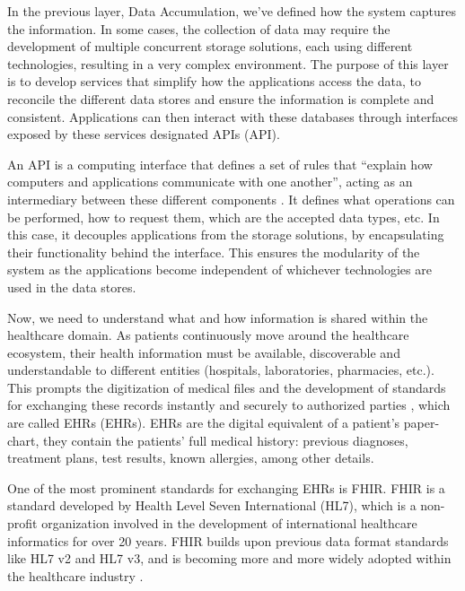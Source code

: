 
In the previous layer, Data Accumulation, we've defined how the system captures the information. In some cases, the collection of data may require the development of multiple concurrent storage solutions, each using different technologies, resulting in a very complex environment. The purpose of this layer is to develop services that simplify how the applications access the data, to reconcile the different data stores and ensure the information is complete and consistent. Applications can then interact with these databases through interfaces exposed by these services designated \acl{API}s (\acs{API}). \bigskip 

An \acs{API} is a computing interface that defines a set of rules that ``explain how computers and applications communicate with one another'', acting as an intermediary between these different components \cite{IBMAPI}. It defines what operations can be performed, how to request them, which are the accepted data types, etc. In this case, it decouples applications from the storage solutions, by encapsulating their functionality behind the interface. This ensures the modularity of the system as the applications become independent of whichever technologies are used in the data stores. \bigskip


Now, we need to understand what and how information is shared within the healthcare domain. As patients continuously move around the healthcare ecosystem, their health information must be available, discoverable and understandable to different entities (hospitals, laboratories, pharmacies, etc.). This prompts the digitization of medical files and the development of standards for exchanging these records instantly and securely to authorized parties \cite{HL72019}, which are called \acl{EHR}s (\acs{EHR}s). \acs{EHR}s are the digital equivalent of a patient's paper-chart, they contain the patients' full medical history: previous diagnoses, treatment plans, test results, known allergies, among other details. \bigskip

One of the most prominent standards for exchanging \acs{EHR}s is \acf{FHIR}. \acs{FHIR} is a standard developed by Health Level Seven International (HL7), which is a non-profit organization involved in the development of international healthcare informatics for over 20 years. \acs{FHIR} builds upon previous data format standards like HL7 v2 and HL7 v3, and is becoming more and more widely adopted within the healthcare industry \cite{Peng2019}. 


